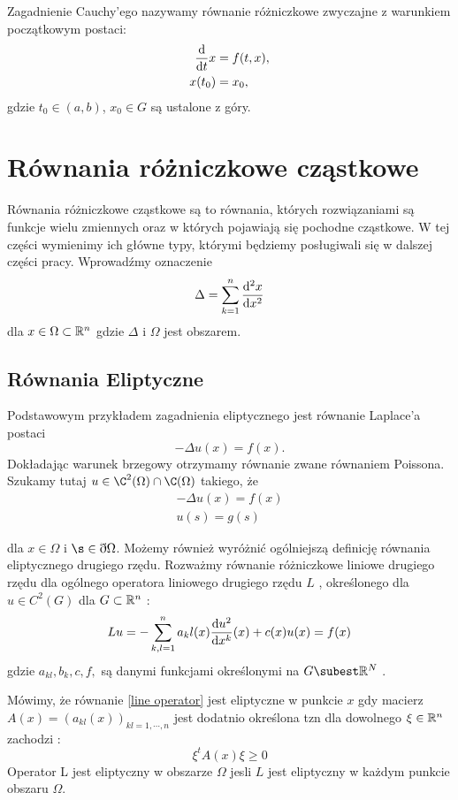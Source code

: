 \documentclass[12pt,a4paper]{report}
\begin{document}
\begin{problem} \label{prob-zagadnienie-cauchy}
Zagadnienie Cauchy'ego nazywamy równanie różniczkowe zwyczajne z warunkiem początkowym postaci:
\begin{align*}
\frac{\mathrm{d} {} }{\mathrm{d}{t}} x &= f(t,x), \\
x(t_0) &= x_0,
\end{align*}
gdzie $t_0 \in (a,b)$, $x_0 \in G$ są ustalone z góry. 
\end{problem}

\section{Równania różniczkowe cząstkowe}
Równania różniczkowe cząstkowe są to równania, których rozwiązaniami są funkcje wielu zmiennych oraz w których pojawiają się pochodne cząstkowe. W tej części wymienimy ich główne typy, którymi będziemy  posługiwali się  w dalszej części pracy. Wprowadźmy oznaczenie 
$$
\Delta = \sum_{k=1}^{n} \ddx[{^2 x}]{x^2}  
$$
dla $ x \in \Omega \subset \mathbb{R}^{n} $ gdzie $\Delta$ i $\Omega$ jest obszarem. 
\subsection{Równania Eliptyczne}
Podstawowym przykładem zagadnienia eliptycznego jest równanie Laplace'a postaci 
$$
-\Delta u(x) = f(x). 
$$
Dokładając warunek brzegowy otrzymamy równanie zwane równaniem Poissona. Szukamy tutaj $u \in \C^2(\Omega) \cap \C(\Omega)$ takiego, że %
\begin{align*}
-\Delta u(x) = f(x)  \\
u(s) = g(s) 
\end{align*}

dla $x \in \Omega$ i $\s \in \eth \Omega$. 
Możemy również wyróżnić ogólniejszą definicję równania eliptycznego drugiego rzędu. Rozważmy równanie różniczkowe liniowe drugiego rzędu dla ogólnego operatora liniowego drugiego rzędu $L$ \label{line operator}, określonego dla $ u \in C^2(G)$ dla $G \subset \mathbb{R}^{n}$ : %
$$
Lu = -\sum_{k,l =1}^{n} a_kl(x) \ddx[u^2]{x^k} (x) + c(x)u(x) = f(x) 
$$
gdzie $ a_{kl}, b_{k}, c, f, $ są danymi funkcjami określonymi na $G \subest \setR^N$ .
\begin{definition}
Mówimy, że równanie  \ref{line operator} jest eliptyczne w punkcie $x$ gdy macierz $A(x) = (a_{kl}(x))_{kl=1,\cdots,n}$ jest dodatnio określona tzn dla dowolnego $ \xi \in \mathbb{R}^{n}$ zachodzi :
$$
\xi^{t} A(x) \xi \geq 0
$$
Operator L jest eliptyczny w obszarze $\Omega$ jesli $L$ jest eliptyczny w każdym punkcie obszaru $\Omega$.
\end{definition}
\end{document}
